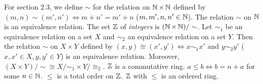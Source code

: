  For section 2.3, we define $\sim$ for the relation on $\operatorname{\mathbb{N}} \times \operatorname{\mathbb{N}}$ defined by $(m, n) \sim (m', n') \iff m + n' = m' + n$ ($m, m', n, n' \in \operatorname{\mathbb{N}}$).
 The relation $\sim$ on $\operatorname{\mathbb{N}}$ is an equivalence relation.
 The set $\operatorname{\mathbb{Z}}$ of \textit{integers} is $(\operatorname{\mathbb{N}} \times \operatorname{\mathbb{N}}) / \sim$.
 Let $\sim_1$ be an equivalence relation on a set $X$ and $\sim_2$ an equivalence relation on a set $Y$. Then the relation $\sim$ on $X \times Y$ defined by $(x, y) \cong (x', y') \iff x \sim_1 x' \text{ and } y \sim_2 y'$ ($x, x' \in X, y, y' \in Y$) is an equivalence relation. Moreover, $(X \times Y) / \sim \cong X / \sim_1 \times Y / \cong_2$.
 $\operatorname{\mathbb{Z}}$ is a commutative ring.
 $a \leq b \iff b = n + a$ for some $n \in \operatorname{\mathbb{N}}$.
 $\leq$ is a total order on $\operatorname{\mathbb{Z}}$.
 $\operatorname{\mathbb{Z}}$ with $\leq$ is an ordered ring.
